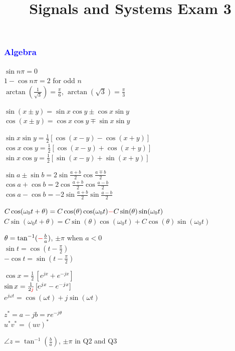 \documentclass[4pt]{article}
\title{Signals and Systems Exam 3}
\theoremstyle{definition}
\theoremstyle{definition}
\renewcommand{\o}{\omega}
\newcommand{\red}[1]{\textcolor{red}{#1}}
\newcommand{\blue}[1]{\textcolor{blue}{#1}}
\begin{document}
\begin{landscape}
\raggedright
\begin{multicols}{3} %
\raggedcolumns
\subsubsection*{\blue{Algebra}}
    $\sin n\pi = 0$\\
    $1-\cos n\pi = 2$ for odd $n$\\
    $\arctan(\frac{1}{\sqrt{3}}) = \frac{\pi}{6}$,  $\arctan(\sqrt{3}) = \frac{\pi} 3$

    $\sin(x\pm y) = \sin x \cos y \pm \cos x \sin y$\\
    $\cos(x\pm y) = \cos x \cos y \mp \sin x \sin y$

    $\sin x \sin y = \frac{1}{2}[\cos(x-y) - \cos(x+y)]$\\ %
    $\cos x \cos y = \frac{1}{2}[\cos(x-y) + \cos(x+y)]$\\
    $\sin x \cos y = \frac{1}{2}[\sin(x-y) + \sin(x+y)]$

    \(\sin a \pm \sin b = 2\sin \frac{a+b}{2} \cos \frac{a\mp b}{2}\)\\
    \(\cos a + \cos b = 2\cos \frac{a+b}{2} \cos \frac{a-b}{2}\)\\
    \(\cos a - \cos b = -2\sin \frac{a+b}{2} \sin \frac{a-b}{2}\)

    $C \cos(\o_0 t + \theta) = C\cos(\theta) \cos(\o_0 t) \red - C\sin(\theta)\sin(\o_0 t)$\\ 
    $C \sin(\o_0 t + \theta) = C\sin(\theta) \cos(\o_0 t) + C\cos(\theta)\sin(\o_0 t)$

    $\theta = \tan^{-1} (\red - \frac b a)$, $\pm \pi$ when $a<0$\\
    $\sin t = \cos (t - \frac{\pi}{2})$\\
    \(-\cos t = \sin(t - \frac{\pi}{2})\)

    $\cos x = \frac{1}{2}\,[e^{jx} + e^{-jx}]$\\
    $\sin x = \frac{1}{2 \red j}\, [e^{jx} - e^{-jx}]$\\
    $e^{j\o t} = \cos(\o t) + j\sin (\o t)$

    $z^* = a-jb = re^{-j\theta}$\\
    $u^* v^* = (uv)^*$

    $\angle z = \tan^{-1}(\frac b a)$, $\pm \pi$ in Q2 and Q3


\end{multicols}
\end{landscape}
\end{document}
